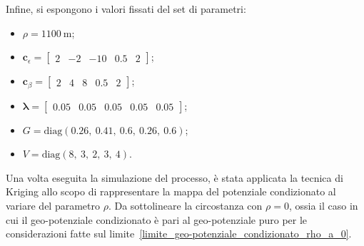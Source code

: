 Infine, si espongono i valori fissati del set di parametri:
\begin{itemize}
	\item $\rho = \SI{1100}{\meter}$;
	\item $\mathbf{c}_\epsilon = \begin{bmatrix} 2 & -2 & -10 & 0.5 & 2 \end{bmatrix}$;
	\item $\mathbf{c}_\beta = \begin{bmatrix} 2 & 4 & 8 & 0.5 & 2 \end{bmatrix}$;
	\item $\boldsymbol{\lambda} = \begin{bmatrix} 0.05 & 0.05  & 0.05 & 0.05  & 0.05  \end{bmatrix}$;
	\item $G = \text{diag}(0.26,\ 0.41,\ 0.6,\ 0.26,\ 0.6)$;
	\item $V = \text{diag}(8,\ 3,\ 2,\ 3,\ 4)$.
\end{itemize}
Una volta eseguita la simulazione del processo, è stata applicata la tecnica di Kriging allo scopo di rappresentare la mappa del potenziale condizionato al variare del parametro $\rho$. Da sottolineare la circostanza con $\rho = 0$, ossia il caso in cui il geo-potenziale condizionato è pari al geo-potenziale puro per le considerazioni fatte sul limite~\ref{limite_geo-potenziale_condizionato_rho_a_0}.

